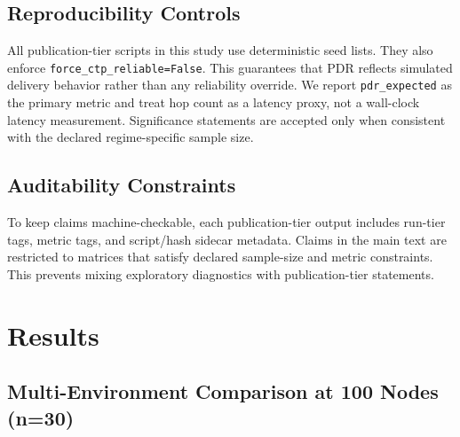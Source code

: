 ﻿\documentclass[sensors,article,submit,moreauthors,pdftex]{Definitions/mdpi}
\begin{document}
\subsection{Reproducibility Controls}
All publication-tier scripts in this study use deterministic seed lists. They also enforce \texttt{force\_ctp\_reliable=False}. This guarantees that PDR reflects simulated delivery behavior rather than any reliability override. We report \texttt{pdr\_expected} as the primary metric and treat hop count as a latency proxy, not a wall-clock latency measurement. Significance statements are accepted only when consistent with the declared regime-specific sample size.

\subsection{Auditability Constraints}
To keep claims machine-checkable, each publication-tier output includes run-tier tags, metric tags, and script/hash sidecar metadata. Claims in the main text are restricted to matrices that satisfy declared sample-size and metric constraints. This prevents mixing exploratory diagnostics with publication-tier statements.

\section{Results}
\subsection{Multi-Environment Comparison at 100 Nodes (n=30)}
\begin{table}[H]
\caption{PDR by environment at 100 nodes (mean $\pm$ std; standard deviations are reported as stored in the source result file).}
\label{tab:pdr100}
\centering
{}
\end{table}
\end{document}
